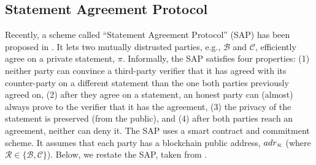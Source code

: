 


\subsection{Statement Agreement Protocol}\label{SAP}

Recently, a scheme called ``Statement Agreement Protocol'' (SAP)  has been proposed in \cite{cryptoeprint:2021:1145}. It   lets two mutually distrusted parties, e.g., $\mathcal{B}$ and $\mathcal{C}$, efficiently agree on a private statement, $\pi$. Informally, the SAP  satisfies four  properties: (1) neither party can convince  a third-party  verifier that it has agreed with its counter-party on a different statement than the one both parties previously agreed on, (2) after they  agree on a statement,  an honest party can (almost) always  prove to the verifier that it has the agreement, (3) the privacy of the statement is preserved (from the public), and (4) after both parties reach an agreement, neither can  deny it.  The SAP uses a  smart contract and commitment scheme. It  assumes that each party  has a blockchain public address,  $adr_{\scriptscriptstyle\mathcal{R}}$ (where $\mathcal{R}\in\{\mathcal{B,C}\}$). Below, we restate  the  SAP, taken from \cite{cryptoeprint:2021:1145}. 



